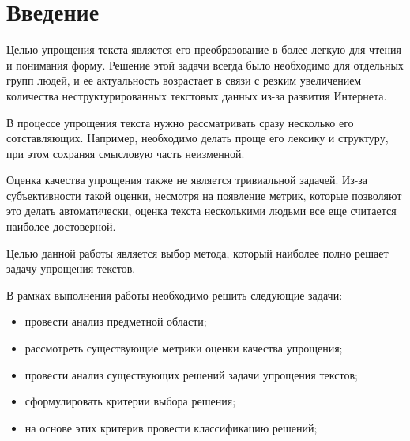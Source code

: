 \chapter*{Введение}

Целью упрощения текста является его преобразование в более легкую для чтения и понимания форму. Решение этой задачи всегда было необходимо для отдельных групп людей, и ее актуальность возрастает в связи с резким увеличением количества неструктурированных текстовых данных из-за развития Интернета.

В процессе упрощения текста нужно рассматривать сразу несколько его сотставляющих. Например, необходимо делать проще его лексику и структуру, при этом сохраняя смысловую часть неизменной.

Оценка качества упрощения также не является тривиальной задачей. Из-за субъективности такой оценки, несмотря на появление метрик, которые позволяют это делать автоматически, оценка текста несколькими людьми все еще считается наиболее достоверной.

Целью данной работы является выбор метода, который наиболее полно решает задачу упрощения текстов.

В рамках выполнения работы необходимо решить следующие задачи: 
\begin{itemize}
	\item провести анализ предметной области;
	\item рассмотреть существующие метрики оценки качества упрощения;
	\item провести анализ существующих решений задачи упрощения текстов;
	\item сформулировать критерии выбора решения;
	\item на основе этих критерив провести классификацию решений;
\end{itemize}

